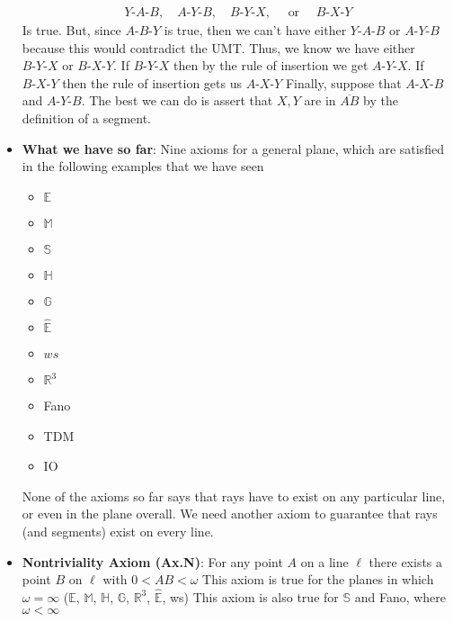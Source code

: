 \documentclass{report}
\begin{document}
\begin{itemize}
\begin{align*}
                Y\text{-}A\text{-}B, \quad A\text{-}Y\text{-}B, \quad B\text{-}Y\text{-}X, \quad \text{ or } \quad B\text{-}X\text{-}Y 
            \end{align*}
            Is true. But, since $ A\text{-}B\text{-}Y$ is true, then we can't have either $ Y\text{-}A\text{-}B$ or $ A\text{-}Y\text{-}B$ because this would contradict the UMT. Thus, we know we have either $ B\text{-}Y\text{-}X$  or $ B\text{-}X\text{-}Y$. If $ B\text{-}Y\text{-}X$ then by the rule of insertion we get $ A\text{-}Y\text{-}X$. If $ B\text{-}X\text{-}Y $ then the rule of insertion gets us $ A\text{-}X\text{-}Y$
            \bigbreak \noindent 
            Finally, suppose that $ A\text{-}X\text{-}B$ and $ A\text{-}Y\text{-}B$. The best we can do is assert that $X,Y$ are in $ \overline{AB}$ by the definition  of a segment.
        \item \textbf{What we have so far}: Nine axioms for a general plane, which are satisfied in the following examples that we have seen
            \begin{itemize}
                \item $\mathbb{E} $
                \item $\mathbb{M} $
                \item $\mathbb{S} $
                \item $\mathbb{H} $
                \item $\mathbb{G} $
                \item $\hat{\mathbb{E}} $
                \item $ws$
                \item $\mathbb{R}^{3} $
                \item Fano
                \item TDM
                \item IO
            \end{itemize}
            None of the axioms so far says that rays have to exist on any particular line, or even in the plane overall. We need another axiom to guarantee that rays (and segments) exist on every line.
        \item \textbf{Nontriviality Axiom (Ax.N)}: For any point $A$ on a line $\ell$ there exists a point $B$ on $\ell$ with $0 < AB < \omega$
            \bigbreak \noindent 
            This axiom is true for the planes in which $\omega = \infty$ ($\mathbb{E}$, $\mathbb{M}$, $\mathbb{H}$, $\mathbb{G}$, $\mathbb{R}^{3}$, $\hat{\mathbb{E}} $, ws)
            \bigbreak \noindent 
            This axiom is also true for $\mathbb{S}$ and Fano, where $\omega < \infty $

\end{itemize}
\end{document}
